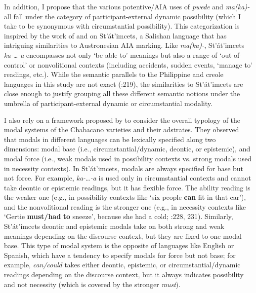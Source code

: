 \documentclass[output=paper]{langsci/langscibook}
\begin{document}
In addition, I propose that the various potentive/AIA uses of \textit{pwede} and \textit{ma(ka)-} all fall under the category of participant-external dynamic possibility (which I take to be synonymous with circumstantial possibility). This categorization is inspired by the work of \citet{MatthewsonEtAl2005} and \citet{DavisEtAl2009} on St’át’imcets, a Salishan language that has intriguing similarities to Austronesian AIA marking. Like \textit{ma(ka)-}, St’át’imcets \textit{ka-…-a} encompasses not only ‘be able to’ meanings but also a range of ‘out-of-control’ or nonvolitional contexts (including accidents, sudden events, ‘manage to’ readings, etc.). While the semantic parallels to the Philippine and creole languages in this study are not exact (\citealt{DavisEtAl2009}:219), the similarities to St’át’imcets are close enough to justify grouping all these different semantic notions under the umbrella of participant-external dynamic or circumstantial modality. 

I also rely on a framework proposed by \citet{MatthewsonEtAl2005} to consider the overall typology of the modal systems of the Chabacano varieties and their adstrates. They observed that modals in different languages can be lexically specified along two dimensions: modal base (i.e., circumstantial/dynamic, deontic, or epistemic), and modal force (i.e., weak modals used in possibility contexts vs. strong modals used in necessity contexts). In St’át’imcets, modals are always specified for base but not force. For example, \textit{ka-…-a} is used only in circumstantial contexts and cannot take deontic or epistemic readings, but it has flexible force. The ability reading is the weaker one (e.g., in possibility contexts like ‘six people \textbf{can} fit in that car’), and the nonvolitional reading is the stronger one (e.g., in necessity contexts like ‘Gertie \textbf{must/had} \textbf{to} sneeze’, because she had a cold; \citealt{DavisEtAl2009}:228, 231). Similarly, St’át’imcets deontic and epistemic modals take on both strong and weak meanings depending on the discourse context, but they are fixed to one modal base. This type of modal system is the opposite of languages like English or Spanish, which have a tendency to specify modals for force but not base; for example, \textit{can/could} takes either deontic, epistemic, or circumstantial/dynamic readings depending on the discourse context, but it always indicates possibility and not necessity (which is covered by the stronger \textit{must}).
\end{document}
